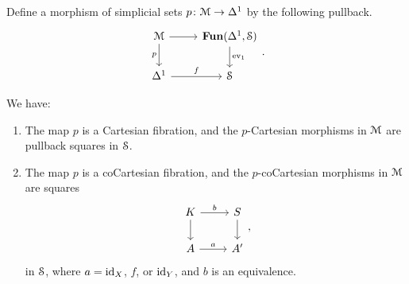 \documentclass[main.tex]{subfiles}
\begin{document}
\begin{definition}
  Define a morphism of simplicial sets $p\colon \category{M} \to \Delta^{1}$ by the following pullback.
  \begin{equation*}
    \begin{tikzcd}
      \category{M}
      \arrow[r]
      \arrow[d, swap, "p"]
      & \Fun(\Delta^{1}, \S)
      \arrow[d, "\ev_{1}"]
      \\
      \Delta^{1}
      \arrow[r, "f"]
      & \S
    \end{tikzcd}.
  \end{equation*}
\end{definition}

\begin{proposition}
  We have:
  \begin{enumerate}
    \item The map $p$ is a Cartesian fibration, and the $p$-Cartesian morphisms in $\category{M}$ are pullback squares in $\S$.

    \item The map $p$ is a coCartesian fibration, and the $p$-coCartesian morphisms in $\category{M}$ are squares
      \begin{equation*}
        \begin{tikzcd}
          K
          \arrow[r, "b"]
          \arrow[d]
          & S
          \arrow[d]
          \\
          A
          \arrow[r, "a"]
          & A'
        \end{tikzcd},
      \end{equation*}
      in $\S$, where $a = \id_{X}$, $f$, or $\id_{Y}$, and $b$ is an equivalence.
  \end{enumerate}
\end{proposition}
\end{document}
